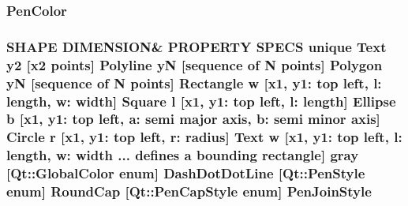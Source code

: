 \subsubsection[{\texorpdfstring{Pen\+Color}{PenColor}}]{ Pen\+Color}\hypertarget{shape__input__file__specs_8txt_a0fa4282f357d62c83340e0b9b2c142b6}{}\label{shape__input__file__specs_8txt_a0fa4282f357d62c83340e0b9b2c142b6}
\subsubsection[{\texorpdfstring{Pen\+Join\+Style}{PenJoinStyle}}]{\setlength{\rightskip}{0pt plus 5cm}S\+H\+A\+PE D\+I\+M\+E\+N\+S\+I\+ON\& P\+R\+O\+P\+E\+R\+TY S\+P\+E\+CS unique {\bf Text} {\bf y2} \mbox{[}{\bf x2} points\mbox{]} {\bf Polyline} yN \mbox{[}sequence of N points\mbox{]} {\bf Polygon} yN \mbox{[}sequence of N points\mbox{]} {\bf Rectangle} w \mbox{[}{\bf x1}, y1\+: top left, l\+: length, w\+: width\mbox{]} {\bf Square} {\bf l} \mbox{[}{\bf x1}, y1\+: top left, l\+: length\mbox{]} {\bf Ellipse} b \mbox{[}{\bf x1}, y1\+: top left, a\+: semi major axis, b\+: semi minor axis\mbox{]} {\bf Circle} r \mbox{[}{\bf x1}, y1\+: top left, r\+: radius\mbox{]} {\bf Text} w \mbox{[}{\bf x1}, y1\+: top left, l\+: length, w\+: width ... defines {\bf a} bounding rectangle\mbox{]} gray \mbox{[}Qt\+::\+Global\+Color enum\mbox{]} Dash\+Dot\+Dot\+Line \mbox{[}Qt\+::\+Pen\+Style enum\mbox{]} Round\+Cap \mbox{[}{\bf Qt\+::\+Pen\+Cap\+Style} enum\mbox{]} Pen\+Join\+Style}\hypertarget{shape__input__file__specs_8txt_a007db2043c6063881de2043c05c9c4a9}{}\label{shape__input__file__specs_8txt_a007db2043c6063881de2043c05c9c4a9}
